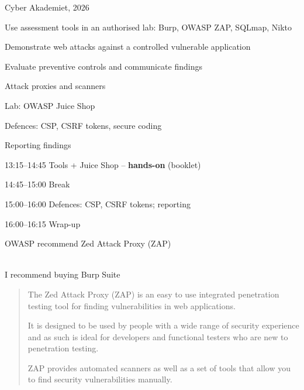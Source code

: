 \documentclass[Screen16to9,17pt]{foils}
\begin{document}
{Cyber Akademiet, 2026}

\begin{list2}
\item Use assessment tools in an authorised lab: Burp, OWASP ZAP, SQLmap, Nikto
\item Demonstrate web attacks against a controlled vulnerable application
\item Evaluate preventive controls and communicate findings
\end{list2}

\begin{list2}
\item Attack proxies and scanners
\item Lab: OWASP Juice Shop
\item Defences: CSP, CSRF tokens, secure coding
\item Reporting findings
\end{list2}

\begin{list2}
\item 13:15--14:45 Tools + Juice Shop -- \textbf{hands-on} (booklet)
\item 14:45--15:00 Break
\item 15:00--16:00 Defences: CSP, CSRF tokens; reporting
\item 16:00--16:15 Wrap-up
\end{list2}



\begin{list1}
\item OWASP recommend Zed Attack Proxy (ZAP)\\
\\
\item I recommend buying Burp Suite \\
\end{list1}


\begin{quote}
The Zed Attack Proxy (ZAP) is an easy to use integrated penetration testing tool for finding vulnerabilities in web applications.

It is designed to be used by people with a wide range of security experience and as such is ideal for developers and functional testers who are new to penetration testing.

ZAP provides automated scanners as well as a set of tools that allow you to find security vulnerabilities manually.
\end{quote}
\end{document}
